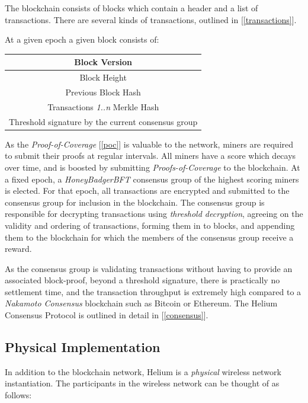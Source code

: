 \documentclass[10pt, nonatbib, nocopyrightspace, reprint]{sigplanconf}
\newcommand{\secref}[1]{[\autoref{#1}]}
\begin{document}
The blockchain consists of blocks which contain a header and a list of transactions. There are several kinds of transactions, outlined in \secref{transactions}.

At a given epoch a given block consists of:

\begin{center}
    \begin{tabular}{|c|}
         \hline
         Block Version \\
         \hline
         Block Height \\
         \hline
         Previous Block Hash \\
         \hline
         Transactions \emph{1..n} Merkle Hash \\
         \hline
         Threshold signature by the current consensus group \\
         \hline
    \end{tabular}
\end{center}

As the \emph{Proof-of-Coverage} \secref{poc} is valuable to the network, miners are required to submit their proofs at regular intervals. All miners have a score which decays over time, and is boosted by submitting \emph{Proofs-of-Coverage} to the blockchain. At a fixed epoch, a \emph{HoneyBadgerBFT} \cite{honeybadger} consensus group of the highest scoring miners is elected. For that epoch, all transactions are encrypted and submitted to the consensus group for inclusion in the blockchain. The consensus group is responsible for decrypting transactions using \emph{threshold decryption}, agreeing on the validity and ordering of transactions, forming them in to blocks, and appending them to the blockchain for which the members of the consensus group receive a reward.

As the consensus group is validating transactions without having to provide an associated block-proof, beyond a threshold signature, there is practically no settlement time, and the transaction throughput is extremely high compared to a \emph{Nakamoto Consensus} blockchain such as Bitcoin or Ethereum. The Helium Consensus Protocol is outlined in detail in \secref{consensus}.

\subsection{Physical Implementation}

In addition to the blockchain network, Helium is a \emph{physical} wireless network instantiation. The participants in the wireless network can be thought of as follows:
\end{document}
